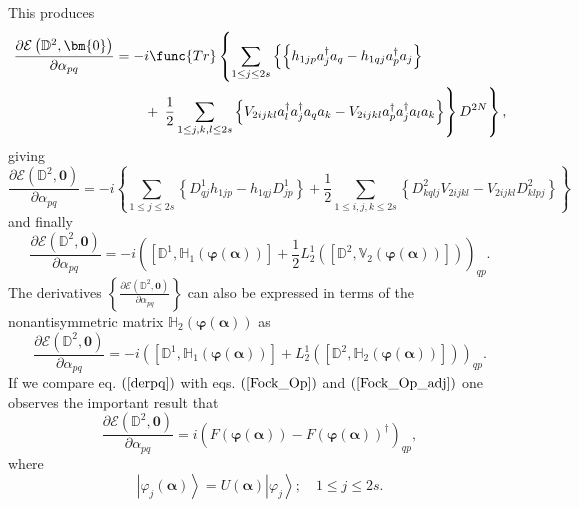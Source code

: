 \documentclass{preprint}
\begin{document}
This produces%
\begin{align}
\frac{\partial \mathcal{E}\left( \mathbb{D}^{2},\bm{0}\right) }{\partial
\alpha _{pq}}=-& i\func{Tr}\left\{ \sum_{1\leq j\leq 2s}\left\{ \left\{
h_{1jp}a_{j}^{\dagger }a_{q}-h_{1qj}a_{p}^{\dagger }a_{j}\right\} \right.
\right.  \notag \\
& +\left. \left. \frac{1}{2}\sum_{1\leq j,k,l\leq 2s}\left\{
V_{2ijkl}a_{l}^{\dagger }a_{j}^{\dagger }a_{q}a_{k}-V_{2ijkl}a_{p}^{\dagger
}a_{j}^{\dagger }a_{l}a_{k}\right\} \right\} D^{2N}\right\} ,
\end{align}%
giving%
\begin{equation}
\frac{\partial \mathcal{E}\left( \mathbb{D}^{2},\bm{0}\right) }{\partial
\alpha _{pq}}=-i\left\{ \sum_{1\leq j\leq 2s}\left\{
D_{qj}^{1}h_{1jp}-h_{1qj}D_{jp}^{1}\right\} +\frac{1}{2}\sum_{1\leq
i,j,k\leq 2s}\left\{ D_{kqlj}^{2}V_{2ijkl}-V_{2ijkl}D_{klpj}^{2}\right\}
\right\}
\end{equation}%
and finally
\begin{equation}
\frac{\partial \mathcal{E}\left( \mathbb{D}^{2},\bm{0}\right) }{\partial
\alpha _{pq}}=-i\left( \left[ \mathbb{D}^{1},\mathbb{H}_{1}\left( %
\bm{\varphi}\left( \bm{\alpha}\right) \right) \right] +\frac{1}{2}%
L_{2}^{1}\left( \left[ \mathbb{D}^{2},\mathbb{V}_{2}\left( \bm{\varphi}%
\left( \bm{\alpha}\right) \right) \right] \right) \right) _{qp}.
\label{derpq}
\end{equation}%
The derivatives $\left\{ \frac{\partial \mathcal{E}\left( \mathbb{D}^{2},%
\bm{0}\right) }{\partial \alpha _{pq}}\right\} $ can also be expressed in
terms of the nonantisymmetric matrix $\mathbb{H}_{2}\left( \bm{\varphi}%
\left( \bm{\alpha}\right) \right) $ as
\begin{equation}
\frac{\partial \mathcal{E}\left( \mathbb{D}^{2},\bm{0}\right) }{\partial
\alpha _{pq}}=-i\left( \left[ \mathbb{D}^{1},\mathbb{H}_{1}\left( %
\bm{\varphi}\left( \bm{\alpha}\right) \right) \right] +L_{2}^{1}\left( \left[
\mathbb{D}^{2},\mathbb{H}_{2}\left( \bm{\varphi }\left( \bm{\alpha}\right)
\right) \right] \right) \right) _{qp}.  \label{derpq1}
\end{equation}%
If we compare eq. $\left( \ref{derpq}\right) $ with eqs. $\left( \ref%
{Fock_Op}\right) $ and $\left( \ref{Fock_Op_adj}\right) $ one observes the
important result that
\begin{equation}
\frac{\partial \mathcal{E}\left( \mathbb{D}^{2},\bm{0}\right) }{\partial
\alpha _{pq}}=i\left( F\left( \bm{\varphi}\left( \bm{\alpha }\right) \right)
-F\left( \bm{\varphi}\left( \bm{\alpha}\right) \right) ^{\dagger }\right)
_{qp},
\end{equation}%
where
\begin{equation}
\left\vert \varphi _{j}\left( \bm{\alpha}\right) \right\rangle =U\left( %
\bm{\alpha}\right) \left\vert \varphi _{j}\right\rangle ;\quad 1\leq j\leq
2s.
\end{equation}
\end{document}
